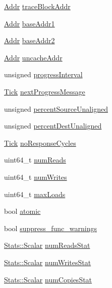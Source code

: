 \begin{DoxyCompactItemize}
\item 
\hyperlink{base_2types_8hh_af1bb03d6a4ee096394a6749f0a169232}{Addr} \hyperlink{classMemTest_ae3e97c58873f5e4cc0933f70403c8c4c}{traceBlockAddr}
\item 
\hyperlink{base_2types_8hh_af1bb03d6a4ee096394a6749f0a169232}{Addr} \hyperlink{classMemTest_a9baf22f315ea7fad548e9714bc63edec}{baseAddr1}
\item 
\hyperlink{base_2types_8hh_af1bb03d6a4ee096394a6749f0a169232}{Addr} \hyperlink{classMemTest_ad6c75fc30aa9f41b4d50e98037de2e2e}{baseAddr2}
\item 
\hyperlink{base_2types_8hh_af1bb03d6a4ee096394a6749f0a169232}{Addr} \hyperlink{classMemTest_a412d3918caf07e4a7ece4af035d8bba8}{uncacheAddr}
\item 
unsigned \hyperlink{classMemTest_ae3960f606add02b45373ddcb89670ce6}{progressInterval}
\item 
\hyperlink{base_2types_8hh_a5c8ed81b7d238c9083e1037ba6d61643}{Tick} \hyperlink{classMemTest_a58289da8d79ce7d01b5649b56bf49883}{nextProgressMessage}
\item 
unsigned \hyperlink{classMemTest_a7e9a130962196ae77a0cedf049200449}{percentSourceUnaligned}
\item 
unsigned \hyperlink{classMemTest_a079b4c1338ed7e0366210d7b784f9bab}{percentDestUnaligned}
\item 
\hyperlink{base_2types_8hh_a5c8ed81b7d238c9083e1037ba6d61643}{Tick} \hyperlink{classMemTest_abd244ba570b7767d45bbc8400f11cb63}{noResponseCycles}
\item 
uint64\_\-t \hyperlink{classMemTest_a0b6f668a9b18b1bf570b1f9bad4318ca}{numReads}
\item 
uint64\_\-t \hyperlink{classMemTest_ab468dc093a7e9b3bd2a17a6b8100e7a8}{numWrites}
\item 
uint64\_\-t \hyperlink{classMemTest_a817c65bf38fc97deca86dee7d5f36029}{maxLoads}
\item 
bool \hyperlink{classMemTest_a927a5f2d0c20b3bb538ebc178df347ce}{atomic}
\item 
bool \hyperlink{classMemTest_a5f4982e0dc4eb2df5f01dd41caaf248b}{suppress\_\-func\_\-warnings}
\item 
\hyperlink{classStats_1_1Scalar}{Stats::Scalar} \hyperlink{classMemTest_a1a927562f3bb1e82c8d841f100b66abe}{numReadsStat}
\item 
\hyperlink{classStats_1_1Scalar}{Stats::Scalar} \hyperlink{classMemTest_a5ddc16e6d03c7e8091be867da3a20094}{numWritesStat}
\item 
\hyperlink{classStats_1_1Scalar}{Stats::Scalar} \hyperlink{classMemTest_abc679ae651f6703a72b4296a9384caed}{numCopiesStat}
\end{DoxyCompactItemize}

